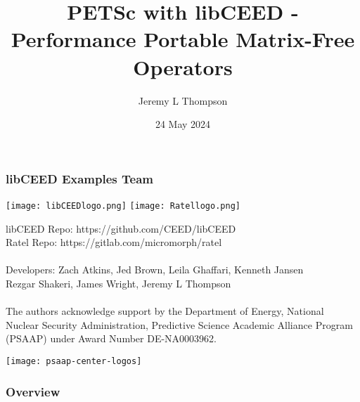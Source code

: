 \documentclass{beamer}
\title[libCEED]{PETSc with libCEED - Performance Portable Matrix-Free Operators
} %
\author{Jeremy L Thompson} %
\institute[CU Boulder] %
{University of Colorado Boulder \\ %
\medskip
\textit{jeremy@jeremylt.org} %
}
\date{24 May 2024} %
\begin{document}
\begin{frame}
\titlepage %
\end{frame}


\begin{frame}
\frametitle{libCEED Examples Team}

\begin{center}
\texttt{[image: libCEEDlogo.png]}
\texttt{[image: Ratellogo.png]}
\end{center}

{\flushleft

libCEED Repo: https://github.com/CEED/libCEED\\
Ratel Repo: https://gitlab.com/micromorph/ratel\\

~\\
Developers: Zach Atkins, Jed Brown, Leila Ghaffari, Kenneth Jansen\\
\hspace{19mm} Rezgar Shakeri, James Wright, Jeremy L Thompson\\

~\\

{\tiny The authors acknowledge support by the Department of Energy, National Nuclear Security Administration, Predictive Science Academic Alliance Program (PSAAP) under Award Number DE-NA0003962.}

}

\begin{center}
\texttt{[image: psaap-center-logos]}
\end{center}

\end{frame}


\begin{frame}
\frametitle{Overview} %
\tableofcontents %
\end{frame}
\end{document}
